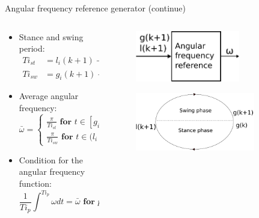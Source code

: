 \documentclass{beamer}
\begin{document}
\begin{frame}{Angular frequency reference generator (continue)}
\begin{columns}
\begin{column}{0.5\textwidth}
\begin{itemize}
	\item Stance and swing period:
	\begin{align*}
	Ti_{st} &= l_i(k+1) - g_i(k) \\
	Ti_{sw} &= g_i(k+1) - l_i(k+1),
	\end{align*}
	\item Average angular frequency:
	\begin{equation*}
	\bar{\omega} = \begin{cases}
	\frac{\pi}{Ti_{st}} \textbf{ for } t \in [g_i(k),l_i(k+1)] \\
	\frac{\pi}{Ti_{sw}} \textbf{ for } t \in (l_i(k+1),g_i(k+1)] 
	\end{cases}\label{eq:angularfreq}
	\end{equation*}
	\item Condition for the angular frequency function:
	\begin{equation*}
	\frac{1}{Ti_{p}}\int^{Ti_{p}} \omega dt = \bar{\omega} \textbf{ for } p = st,sw.\label{eq:angularfrequencycondition}
	\end{equation*} 
\end{itemize}
\end{column}
\hspace{1cm}

\begin{column}{0.5\textwidth}
\begin{figure}[H]
			\includegraphics[width=0.7\textwidth]{AngularFrequency.pdf}
\end{figure}
\begin{figure}[H]
			\includegraphics[width=0.8\textwidth]{PhasesPeriod.pdf}
\end{figure}
\end{column}
\end{columns}
\end{frame}
\end{document}
